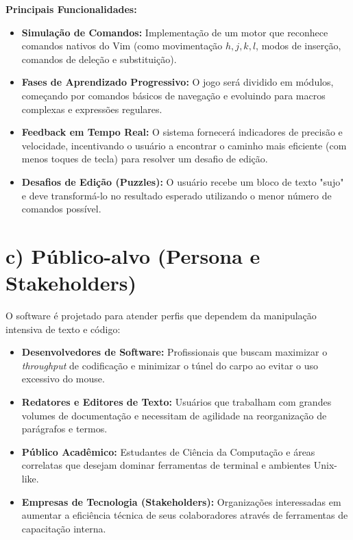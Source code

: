 \documentclass[12pt,a4paper]{article}
\begin{document}
\textbf{Principais Funcionalidades:}
\begin{itemize}
    \item \textbf{Simulação de Comandos:} Implementação de um motor que reconhece comandos nativos do Vim (como movimentação $h, j, k, l$, modos de inserção, comandos de deleção e substituição).
    \item \textbf{Fases de Aprendizado Progressivo:} O jogo será dividido em módulos, começando por comandos básicos de navegação e evoluindo para macros complexas e expressões regulares.
    \item \textbf{Feedback em Tempo Real:} O sistema fornecerá indicadores de precisão e velocidade, incentivando o usuário a encontrar o caminho mais eficiente (com menos toques de tecla) para resolver um desafio de edição.
    \item \textbf{Desafios de Edição (Puzzles):} O usuário recebe um bloco de texto "sujo" e deve transformá-lo no resultado esperado utilizando o menor número de comandos possível.
\end{itemize}

\section*{c) Público-alvo (Persona e Stakeholders)}

O software é projetado para atender perfis que dependem da manipulação intensiva de texto e código:

\begin{itemize}
    \item \textbf{Desenvolvedores de Software:} Profissionais que buscam maximizar o \textit{throughput} de codificação e minimizar o túnel do carpo ao evitar o uso excessivo do mouse.
    \item \textbf{Redatores e Editores de Texto:} Usuários que trabalham com grandes volumes de documentação e necessitam de agilidade na reorganização de parágrafos e termos.
    \item \textbf{Público Acadêmico:} Estudantes de Ciência da Computação e áreas correlatas que desejam dominar ferramentas de terminal e ambientes Unix-like.
    \item \textbf{Empresas de Tecnologia (Stakeholders):} Organizações interessadas em aumentar a eficiência técnica de seus colaboradores através de ferramentas de capacitação interna.
\end{itemize}
\end{document}
